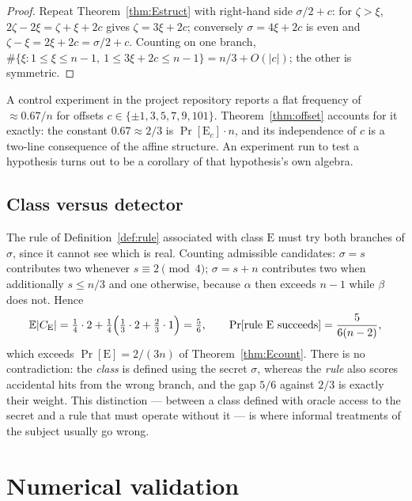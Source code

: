 \documentclass[11pt,a4paper]{article}
\theoremstyle{plain}
\theoremstyle{definition}
\theoremstyle{remark}
\newcommand{\Ex}{\mathbb{E}}
\newcommand{\Pro}{\Pr}
\newcommand{\clE}{\mathrm{E}}
\begin{document}
\begin{proof}
Repeat Theorem~\ref{thm:Estruct} with right-hand side $\sigma/2 + c$: for $\zeta > \xi$,
$2\zeta - 2\xi = \zeta+\xi+2c$ gives $\zeta = 3\xi+2c$; conversely $\sigma = 4\xi+2c$ is even and
$\zeta - \xi = 2\xi+2c = \sigma/2 + c$. Counting on one branch,
$\#\{\xi : 1 \le \xi \le n-1,\ 1 \le 3\xi+2c \le n-1\} = n/3 + O(|c|)$; the other is symmetric.
\end{proof}

A control experiment in the project repository reports a flat frequency of $\approx 0.67/n$ for
offsets $c \in \{\pm1,3,5,7,9,101\}$. Theorem~\ref{thm:offset} accounts for it exactly: the
constant $0.67 \approx 2/3$ is $\Pro[\clE_c]\cdot n$, and its independence of $c$ is a two-line
consequence of the affine structure. An experiment run to test a hypothesis turns out to be a
corollary of that hypothesis's own algebra.

\subsection{Class versus detector}

The rule of Definition~\ref{def:rule} associated with class $\clE$ must try both branches of
$\sigma$, since it cannot see which is real. Counting admissible candidates:
$\sigma = s$ contributes two whenever $s \equiv 2 \pmod 4$; $\sigma = s+n$ contributes two when
additionally $s \le n/3$ and one otherwise, because $\alpha$ then exceeds $n-1$ while $\beta$ does
not. Hence
\begin{equation}\label{eq:EC}
  \Ex|C_{\clE}| = \tfrac14\cdot 2 + \tfrac14\Bigl(\tfrac13\cdot 2 + \tfrac23\cdot 1\Bigr) = \tfrac56,
  \qquad \Pro[\text{rule } \clE \text{ succeeds}] = \frac{5}{6(n-2)} ,
\end{equation}
which exceeds $\Pro[\clE] = 2/(3n)$ of Theorem~\ref{thm:Ecount}. There is no contradiction: the
\emph{class} is defined using the secret $\sigma$, whereas the \emph{rule} also scores accidental
hits from the wrong branch, and the gap $5/6$ against $2/3$ is exactly their weight. This
distinction --- between a class defined with oracle access to the secret and a rule that must
operate without it --- is where informal treatments of the subject usually go wrong.

\section{Numerical validation}\label{sec:numerics}
\end{document}
